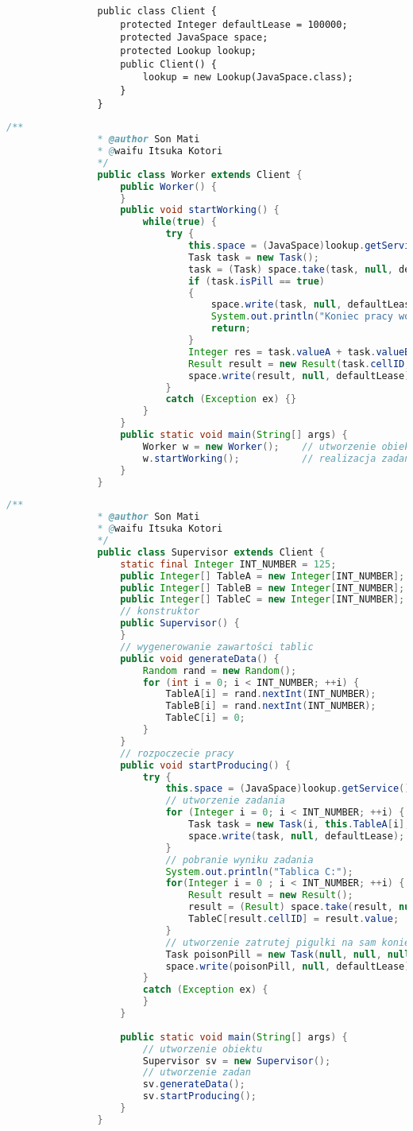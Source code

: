 			\begin{lstlisting}
				public class Client {
					protected Integer defaultLease = 100000;
					protected JavaSpace space;
					protected Lookup lookup;
					public Client() {
						lookup = new Lookup(JavaSpace.class);
					}
				}
			\end{lstlisting}
			\begin{lstlisting}[language=Java]
				/**
				* @author Son Mati
				* @waifu Itsuka Kotori
				*/
				public class Worker extends Client {
					public Worker() {
					}
					public void startWorking() {
						while(true) {
							try {
								this.space = (JavaSpace)lookup.getService();
								Task task = new Task();
								task = (Task) space.take(task, null, defaultLease);
								if (task.isPill == true)
								{
									space.write(task, null, defaultLease);
									System.out.println("Koniec pracy workera.");
									return;
								}
								Integer res = task.valueA + task.valueB;
								Result result = new Result(task.cellID, res);
								space.write(result, null, defaultLease);
							}
							catch (Exception ex) {}
						}
					}
					public static void main(String[] args) {
						Worker w = new Worker();	// utworzenie obiektu
						w.startWorking();			// realizacja zadan
					}
				}
			\end{lstlisting}
			\newpage
			\begin{lstlisting}[language=Java]
				/**
				* @author Son Mati
				* @waifu Itsuka Kotori
				*/
				public class Supervisor extends Client {
					static final Integer INT_NUMBER = 125;
					public Integer[] TableA = new Integer[INT_NUMBER];
					public Integer[] TableB = new Integer[INT_NUMBER];
					public Integer[] TableC = new Integer[INT_NUMBER];
					// konstruktor
					public Supervisor() {
					}
					// wygenerowanie zawartości tablic
					public void generateData() {
						Random rand = new Random();
						for (int i = 0; i < INT_NUMBER; ++i) {
							TableA[i] = rand.nextInt(INT_NUMBER);
							TableB[i] = rand.nextInt(INT_NUMBER);
							TableC[i] = 0;
						}
					}
					// rozpoczecie pracy
					public void startProducing() {
						try {
							this.space = (JavaSpace)lookup.getService();
							// utworzenie zadania
							for (Integer i = 0; i < INT_NUMBER; ++i) {
								Task task = new Task(i, this.TableA[i], this.TableB[i], false);
								space.write(task, null, defaultLease);
							}
							// pobranie wyniku zadania
							System.out.println("Tablica C:");
							for(Integer i = 0 ; i < INT_NUMBER; ++i) {
								Result result = new Result();
								result = (Result) space.take(result, null, defaultLease);
								TableC[result.cellID] = result.value;
							}
							// utworzenie zatrutej pigulki na sam koniec
							Task poisonPill = new Task(null, null, null, true);
							space.write(poisonPill, null, defaultLease);
						}
						catch (Exception ex) {
						}
					}
				
					public static void main(String[] args) {
						// utworzenie obiektu
						Supervisor sv = new Supervisor();
						// utworzenie zadan
						sv.generateData();
						sv.startProducing();
					}
				}
			\end{lstlisting}

